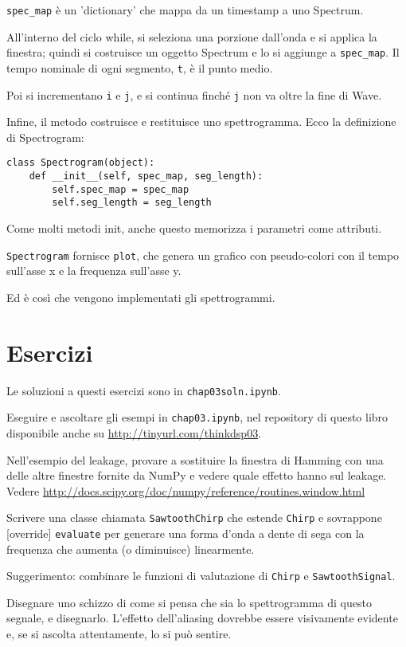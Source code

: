 \documentclass[12pt,a4paper]{book}
\begin{document}
\verb"spec_map" è un 'dictionary' che mappa da un timestamp a uno Spectrum.

All'interno del ciclo while, si seleziona una porzione dall'onda e si applica la finestra; quindi si costruisce un oggetto Spectrum e lo si aggiunge a \verb"spec_map". Il tempo nominale di ogni segmento, {\tt t}, è il punto medio.

Poi si incrementano {\tt i} e {\tt j}, e si continua finché {\tt j} non va oltre la fine di Wave.

Infine, il metodo costruisce e restituisce uno spettrogramma. Ecco la definizione di Spectrogram:

\begin{verbatim} 
class Spectrogram(object):
    def __init__(self, spec_map, seg_length):
        self.spec_map = spec_map
        self.seg_length = seg_length
 \end{verbatim} 

Come molti metodi init, anche questo memorizza i parametri come attributi.

{\tt Spectrogram} fornisce {\tt plot}, che genera un grafico con pseudo-colori con il tempo sull'asse x e la frequenza sull'asse y.

Ed è così che vengono implementati gli spettrogrammi.

\section{Esercizi} 

Le soluzioni a questi esercizi sono in {\tt chap03soln.ipynb}.

\begin{exercise} Eseguire e ascoltare gli esempi in {\tt chap03.ipynb}, nel repository di questo libro disponibile anche su \url{http://tinyurl.com/thinkdsp03}.

Nell'esempio del leakage, provare a sostituire la finestra di Hamming con una delle altre finestre fornite da NumPy e vedere quale effetto hanno sul leakage. Vedere \url{http://docs.scipy.org/doc/numpy/reference/routines.window.html} \end{exercise} 

\begin{exercise} Scrivere una classe chiamata {\tt SawtoothChirp} che estende {\tt Chirp} e sovrappone [override] {\tt evaluate} per generare una forma d'onda a dente di sega con la frequenza che aumenta (o diminuisce) linearmente.

Suggerimento: combinare le funzioni di valutazione di {\tt Chirp} e {\tt SawtoothSignal}.

Disegnare uno schizzo di come si pensa che sia lo spettrogramma di questo segnale, e disegnarlo. L'effetto dell'aliasing dovrebbe essere visivamente evidente e, se si ascolta attentamente, lo si può sentire. \end{exercise} 
\end{document}
